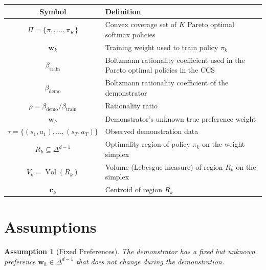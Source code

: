 \documentclass[11pt]{article}
\newtheorem{assumption}{Assumption}
\DeclareMathOperator{\Vol}{Vol}
\begin{document}
\begin{center}
\renewcommand{\arraystretch}{1.3}
\begin{tabular}{cl}
    \hline
    \textbf{Symbol} & \textbf{Definition} \\
    \hline
    $\Pi = \{\pi_1, \ldots, \pi_K\}$ & Convex coverage set of $K$ Pareto optimal softmax policies \\
    $\mathbf{w}_k$ & Training weight used to train policy $\pi_k$ \\
    $\beta_{\text{train}}$ & Boltzmann rationality coefficient used in the Pareto optimal policies in the CCS\\
    $\beta_{\text{demo}}$ & Boltzmann rationality coefficient of the demonstrator \\
    $\rho = \beta_{\text{demo}} / \beta_{\text{train}}$ & Rationality ratio \\
    $\mathbf{w}_h$ & Demonstrator's unknown true preference weight \\
    $\tau = \{(s_1, a_1), \ldots, (s_T, a_T)\}$ & Observed demonstration data \\
    $R_k \subseteq \Delta^{d-1}$ & Optimality region of policy $\pi_k$ on the weight simplex \\
    $V_k = \Vol(R_k)$ & Volume (Lebesgue measure) of region $R_k$ on the simplex \\
    $\mathbf{c}_k$ & Centroid of region $R_k$ \\
    \hline
\end{tabular}
\end{center}

\section{Assumptions}

\begin{assumption}[Fixed Preferences]
\label{a:fixed}
The demonstrator has a fixed but unknown preference $\mathbf{w}_h \in \Delta^{d-1}$ that does not change during the demonstration.
\end{assumption}
\end{document}
